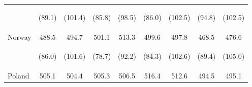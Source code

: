 \begin{center}
\begin{tabular}{lcccccccc}
 & \begin{footnotesize}(89.1)\end{footnotesize} & \begin{footnotesize}(101.4)\end{footnotesize} & \begin{footnotesize}(85.8)\end{footnotesize} & \begin{footnotesize}(98.5)\end{footnotesize} & \begin{footnotesize}(86.0)\end{footnotesize} & \begin{footnotesize}(102.5)\end{footnotesize} & \begin{footnotesize}(94.8)\end{footnotesize} & \begin{footnotesize}(102.5)\end{footnotesize}\\
\noalign{\smallskip}Norway & 488.5 & 494.7 & 501.1 & 513.3 & 499.6 & 497.8 & 468.5 & 476.6\\
 & \begin{footnotesize}(86.0)\end{footnotesize} & \begin{footnotesize}(101.6)\end{footnotesize} & \begin{footnotesize}(78.7)\end{footnotesize} & \begin{footnotesize}(92.2)\end{footnotesize} & \begin{footnotesize}(84.3)\end{footnotesize} & \begin{footnotesize}(102.6)\end{footnotesize} & \begin{footnotesize}(89.4)\end{footnotesize} & \begin{footnotesize}(105.0)\end{footnotesize}\\
\noalign{\smallskip}Poland & 505.1 & 504.4 & 505.3 & 506.5 & 516.4 & 512.6 & 494.5 & 495.1\\

\end{tabular}
\end{center}
